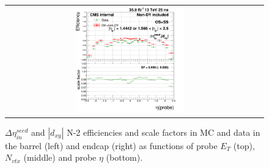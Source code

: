 \begin{figure}[bh]
\begin{center}
\begin{tabular}{cc}
      \includegraphics[width=0.45\textwidth]{figures/Zprime/2016/ScaleFactor/SameSign/N_1_eff/g_compare_cut_eta_Barrel+Endcap_ea_ta_inc_AS_N_2_DetaIn_Dxy_PUW.png}
    \end{tabular}
    \caption{$\Delta \eta_{in}^{seed}$ and $|d_{xy}|$ N-2 efficiencies and scale factors in MC and data in the barrel (left) and endcap (right) as functions of probe $E_T$ (top), $N_{vtx}$ (middle) and probe $\eta$ (bottom).}
    \label{fig:DetaIn_Dxy_2016}
  \end{center}
\end{figure}


